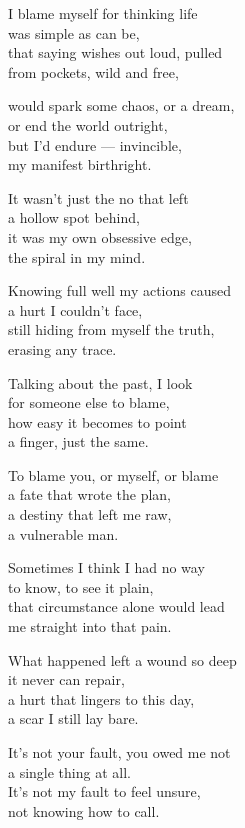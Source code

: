 \begin{lyrics}
I blame myself for thinking life\\
was simple as can be,\\
that saying wishes out loud, pulled\\
from pockets, wild and free,

would spark some chaos, or a dream,\\
or end the world outright,\\
but I'd endure — invincible,\\
my manifest birthright.

It wasn't just the no that left\\
a hollow spot behind,\\
it was my own obsessive edge,\\
the spiral in my mind.

Knowing full well my actions caused\\
a hurt I couldn't face,\\
still hiding from myself the truth,\\
erasing any trace.

Talking about the past, I look\\
for someone else to blame,\\
how easy it becomes to point\\
a finger, just the same.

To blame you, or myself, or blame\\
a fate that wrote the plan,\\
a destiny that left me raw,\\
a vulnerable man.

Sometimes I think I had no way\\
to know, to see it plain,\\
that circumstance alone would lead\\
me straight into that pain.

What happened left a wound so deep\\
it never can repair,\\
a hurt that lingers to this day,\\
a scar I still lay bare.

It's not your fault, you owed me not\\
a single thing at all.\\
It's not my fault to feel unsure,\\
not knowing how to call.


\end{lyrics}
